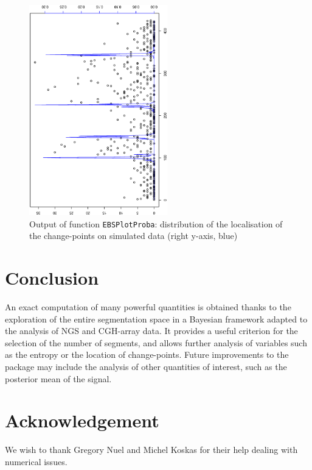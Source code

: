 \documentclass{bioinfo}
\begin{document}
\begin{methods}
\begin{figure}[!h]%
\centerline{\includegraphics[width=6cm,angle=270]{my-segmentation.ps}}
\caption{Output of function \texttt{EBSPlotProba}: distribution of the localisation of the change-points on simulated data (right y-axis, blue)}\label{fig:02}
\end{figure}




\section{Conclusion}

An exact computation of many powerful quantities is obtained thanks to the exploration of the entire segmentation space in a Bayesian framework adapted to the analysis of NGS and CGH-array data.
It provides a useful criterion for the selection of the number of segments, and allows further analysis of variables such as the entropy or the location of change-points. 
Future improvements to the package may include the analysis of other quantities of interest, such as the posterior mean of the signal.



\section*{Acknowledgement}
We wish to thank Gregory Nuel and Michel Koskas for their help dealing with numerical issues.


%
%
%
%

%
%
%
%



\end{methods}
\end{document}
